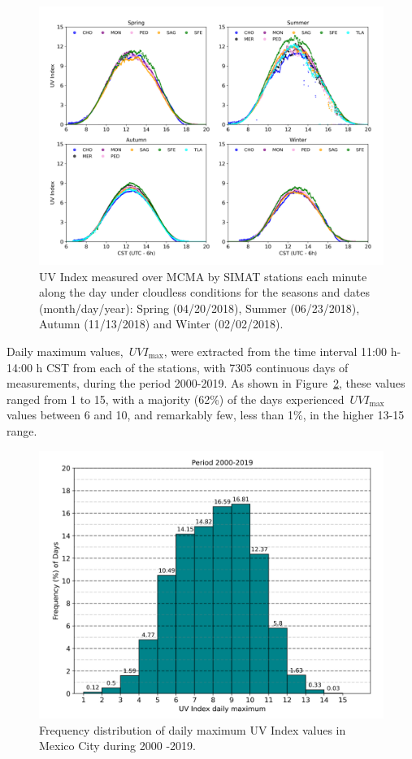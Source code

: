 \documentclass[10pt]{article}
\begin{document}
\begin{figure}[H]
  \begin{center}
    \includegraphics[width=0.70\columnwidth]{figures/season/season}
    \caption{{UV Index measured over MCMA by SIMAT stations each minute along the day
          under cloudless conditions for the seasons and dates (month/day/year):
          Spring (04/20/2018), Summer (06/23/2018), Autumn (11/13/2018) and Winter
          (02/02/2018).
            {\label{628947}}%
        }}
  \end{center}
\end{figure}

Daily maximum values,~\(UVI_{\max}\), were extracted from the time
interval 11:00 h-14:00 h CST from each of the stations, with 7305
continuous days of measurements, during the period 2000-2019. As shown
in Figure~{\ref{461017}}, these values ranged from 1 to
15, with a majority (62\%) of the days experienced~\(UVI_{\max}\)
values between 6 and 10, and remarkably few, less than 1\%, in the
higher 13-15 range.
\begin{figure}[H]
  \begin{center}
    \includegraphics[width=0.49\columnwidth]{figures/HistTotal/HistTotal}
    \caption{{Frequency distribution of daily maximum UV Index values in Mexico City
    during 2000 -2019.
    {\label{461017}}%
    }}
  \end{center}
\end{figure}
\end{document}
